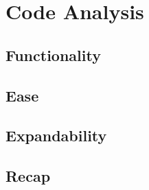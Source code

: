 \chapter{Code Analysis}\label{ch:code}

\section{Functionality}\label{sc:code:functionality}

\section{Ease}\label{sc:code:ease}

\section{Expandability}\label{sc:code:expandability}

\section{Recap}\label{sc:code:recap}
